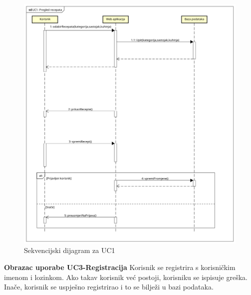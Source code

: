 				
				\begin{figure}[H]
					\includegraphics[scale= 0.4]{slike/sekvencijski_dijagramUC1.png}
					\centering
					\caption{Sekvencijski dijagram za UC1}
					\label{fig:Sekvencijski dijagram za UC1}
				\end{figure} 
				\eject

				\noindent
				\textbf{Obrazac uporabe UC3-Registracija}\newline
					{Korisnik se registrira s korisničkim imenom i lozinkom. Ako takav korisnik već postoji, korisniku se ispisuje greška. Inače, korisnik se uspješno registrirao i to se bilježi u bazi podataka.}
				

